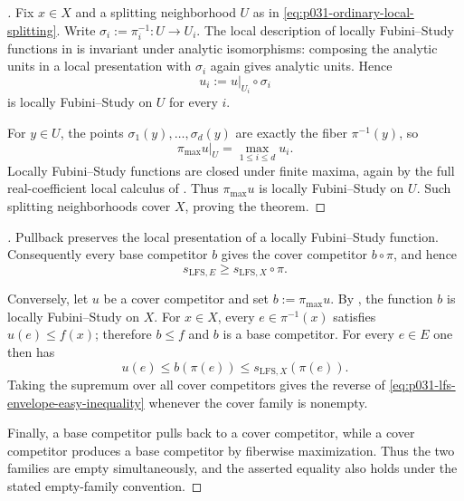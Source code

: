 
\begin{proof}[]
Fix $x\in X$ and a splitting neighborhood $U$ as in
\eqref{eq:p031-ordinary-local-splitting}.  Write
$\sigma_i:=\pi_i^{-1}:U\to U_i$.  The local description of
locally Fubini--Study functions in \cite[\S7.9]{GJR26} is invariant under
analytic isomorphisms: composing the analytic units in a local presentation
with $\sigma_i$ again gives analytic units.  Hence
\[
                         u_i:=u|_{U_i}\circ\sigma_i
\]
is locally Fubini--Study on $U$ for every $i$.

For $y\in U$, the points
$\sigma_1(y),\ldots,\sigma_d(y)$ are exactly the fiber $\pi^{-1}(y)$, so
\begin{equation}
\label{eq:p031-local-fiber-maximum}
                    \pi_{\max}u|_U=\max_{1\leq i\leq d}u_i.
\end{equation}
Locally Fubini--Study functions are closed under finite maxima, again by
the full real-coefficient local calculus of \cite[\S7.9]{GJR26}.  Thus
$\pi_{\max}u$ is locally Fubini--Study on $U$.  Such splitting
neighborhoods cover $X$, proving the theorem.
\end{proof}

\begin{proof}[]
Pullback preserves the local presentation of a locally Fubini--Study
function.  Consequently every base competitor $b$ gives the cover
competitor $b\circ\pi$, and hence
\begin{equation}
\label{eq:p031-lfs-envelope-easy-inequality}
              s_{\mathrm{LFS},E}
                    \geq s_{\mathrm{LFS},X}\circ\pi.
\end{equation}

Conversely, let $u$ be a cover competitor and set
$b:=\pi_{\max}u$.  By , the function $b$
is locally Fubini--Study on $X$.  For $x\in X$, every
$e\in\pi^{-1}(x)$ satisfies $u(e)\leq f(x)$; therefore $b\leq f$ and $b$
is a base competitor.  For every $e\in E$ one then has
\[
              u(e)\leq b(\pi(e))
                    \leq s_{\mathrm{LFS},X}(\pi(e)).
\]
Taking the supremum over all cover competitors gives the reverse of
\eqref{eq:p031-lfs-envelope-easy-inequality} whenever the cover family is
nonempty.

Finally, a base competitor pulls back to a cover competitor, while a cover
competitor produces a base competitor by fiberwise maximization.  Thus the
two families are empty simultaneously, and the asserted equality also holds
under the stated empty-family convention.
\end{proof}
